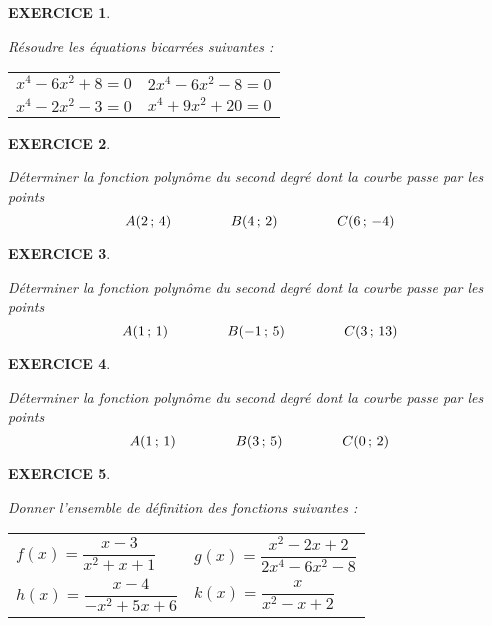 \documentclass[a4paper]{article}   %
\renewcommand{\(}{\left(}
\renewcommand{\)}{\right)}
\newtheorem{EXO}{\large EXERCICE }
\newenvironment{EX}   { \setcounter{ques}{0} \begin{EXO} \hrulefill ~\vspace{0.3cm}

\normalfont}    {\end{EXO} \medskip}
\newcommand{\f}{\dfrac} 	%
\begin{document}
\begin{center} 	
\end{center}
{\large{


\begin{EX} 
Résoudre les équations bicarrées suivantes : 
\begin{enumerate}
\renewcommand{\tabularxcolumn}[1]{b{#1}}
\begin{tabularx}{\linewidth}{XX}	
\item $x^4-6x^2+8=0$&
\item $2x^4-6x^2-8=0$ \\
\item $x^4-2x^2-3=0$&
\item $x^4+9x^2+20=0$\\
\end{tabularx}
\end{enumerate}
\end{EX}

\begin{EX} 
Déterminer la fonction polynôme du second degré dont la courbe passe par les points 
$$A(2\,;\,4) \hspace{1.5cm} B(4\,;\,2) \hspace{1.5cm} C(6\,;\,-4)$$
\end{EX}

\begin{EX} 
Déterminer la fonction polynôme du second degré dont la courbe passe par les points 
$$A(1\,;\,1) \hspace{1.5cm} B(-1\,;\,5) \hspace{1.5cm} C(3\,;\,13)$$
\end{EX}

\begin{EX} 
Déterminer la fonction polynôme du second degré dont la courbe passe par les points 
$$A(1\,;\,1) \hspace{1.5cm} B(3\,;\,5) \hspace{1.5cm} C(0\,;\,2)$$
\end{EX}

\begin{EX} 
Donner l'ensemble de définition des fonctions suivantes :
\begin{enumerate}
\renewcommand{\tabularxcolumn}[1]{b{#1}}
\begin{tabularx}{\linewidth}{XX}	
\item $f(x)=\f{x-3}{x^2+x+1}$&
\item $g(x)=\f{x^2-2x+2}{2x^4-6x^2-8}$ \\
\item $h(x)=\f{x-4}{-x^2+5x+6}$&
\item $k(x)=\f{x}{x^2-x+2}$\\
\end{tabularx}
\end{enumerate}
\end{EX}

}}
\end{document}
